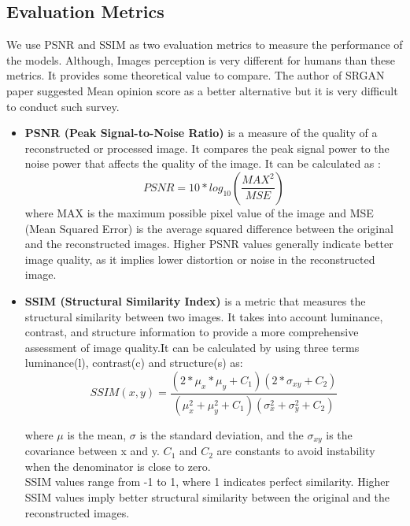     \subsection{Evaluation Metrics}
    We use PSNR and SSIM as two evaluation metrics to measure the performance of the models. Although, Images perception is very different for humans than these metrics. It provides some theoretical value to compare. The author of SRGAN paper suggested Mean opinion score as a better alternative but it is very difficult to conduct such survey.\\
    \begin{itemize}
        \item {\bf PSNR (Peak Signal-to-Noise Ratio)} is a measure of the quality of a reconstructed or processed image. It compares the peak signal power to the noise power that affects the quality of the image. It can be calculated as :
        \begin{equation}
            PSNR = 10*log_{10}(\frac{MAX^{2}}{MSE})
        \end{equation}
            where MAX is the maximum possible pixel value of the image and MSE (Mean Squared Error) is the average squared difference between the original and the reconstructed images. Higher PSNR values generally indicate better image quality, as it implies lower distortion or noise in the reconstructed image.\\
        \item { \bf SSIM (Structural Similarity Index)} is a metric that measures the structural similarity between two images. It takes into account luminance, contrast, and structure information to provide a more comprehensive assessment of image quality.It can be calculated by using three terms luminance(l), contrast(c) and structure(s) as:
        \begin{equation}
            SSIM(x,y)= \frac{(2*\mu _x*\mu _y+C_1)(2*\sigma_{xy}+C_2)}{(\mu_x^2+\mu_y^2+C_1)(\sigma_x^2+\sigma_y^2+C_2)}
        \end{equation}
        
        where $\mu$ is the mean, $\sigma$ is the standard deviation, and the $\sigma_{xy}$ is the covariance between x and y. $C_1$ and $C_2$ are constants to avoid instability when the denominator is close to zero. \\
        SSIM values range from -1 to 1, where 1 indicates perfect similarity. Higher SSIM values imply better structural similarity between the original and the reconstructed images.
    
    \end{itemize}
    
    
